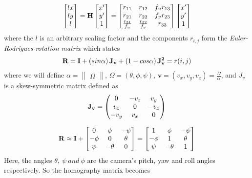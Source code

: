 \begin{equation}
    \begin{bmatrix}
    lx\\ly\\l
    \end{bmatrix}
    = \bf{H}
    \begin{bmatrix}
    x' \\ y' \\ 1
    \end{bmatrix}
    = 
    \begin{bmatrix}
    r_{11} & r_{12} & f_u r_{13}\\
    r_{21} & r_{22} & f_v r_{23}\\
    \frac{r_{31}}{f_u} & \frac{r_{32}}{f_v} & r_{33}
    \end{bmatrix}
    \begin{bmatrix}
    x' \\ y' \\ 1
    \end{bmatrix}
\end{equation}
where the $l$ is an arbitrary scaling factor and the components $r_{i,j}$ form the \textit{Euler-Rodrigues rotation matrix} \cite{DAI2015144} which states
\begin{equation}
    {\bf R} = {\bf I} + \left( sin \alpha \right) {\bf J_v} + \left( 1 - cos \alpha \right) {\bf J_v^2} = r(i,j)
\end{equation}
where we will define $\alpha = \begin{Vmatrix} \Omega \end{Vmatrix}$,  $\Omega = (\theta, \phi, \psi)$, $\textbf{v} = (v_x,v_y,v_z) = \frac{\Omega}{\alpha}$, and \textbf{$J_v$} is a skew-symmetric matrix defined as
\begin{equation}
\bf{J_v} = 
\begin{pmatrix}
0 & -v_z & v_y \\
v_z & 0 & -v_x \\
-v_y & v_x & 0
\end{pmatrix}    
\end{equation}

\begin{equation}
{\bf R} \approx {\bf I} + 
\begin{bmatrix}
0 & \phi & -\psi \\
-\phi & 0 & \theta \\
\psi & -\theta & 0
\end{bmatrix} =
\begin{bmatrix}
1 & \phi & -\psi \\
-\phi & 1 & \theta \\
\psi & -\theta & 1
\end{bmatrix}    
\end{equation}
Here, the angles $\theta, ~ \psi ~ and ~ \phi$ are the camera's pitch, yaw and roll angles respectively. So the homography matrix becomes

